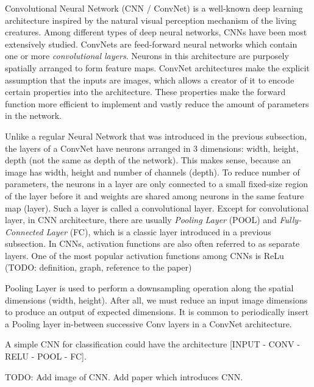 Convolutional Neural Network (CNN / ConvNet) is a well-known deep learning architecture inspired by the natural visual perception mechanism of the living creatures. Among different types of deep neural networks, CNNs have been most extensively studied. ConvNets are feed-forward neural networks which contain one or more \textit{convolutional layers}. Neurons in this architecture are purposely spatially arranged to form feature maps. ConvNet architectures make the explicit assumption that the inputs are images, which allows a creator of it to encode certain properties into the architecture. These properties make the forward function more efficient to implement and vastly reduce the amount of parameters in the network.

Unlike a regular Neural Network that was introduced in the previous subsection, the layers of a ConvNet have neurons arranged in 3 dimensions: width, height, depth (not the same as depth of the network). This makes sense, because an image has width, height and number of channels (depth). To reduce number of parameters, the neurons in a layer are only connected to a small fixed-size region of the layer before it and weights are shared among neurons in the same feature map (layer). Such a layer is called a convolutional layer. Except for convolutional layer, in CNN architecture, there are usually \textit{Pooling Layer} (POOL) and \textit{Fully-Connected Layer} (FC), which is a classic layer introduced in a previous subsection. In CNNs, activation functions are also often referred to as separate layers. One of the most popular activation functions among CNNs is ReLu (TODO: definition, graph, reference to the paper)

Pooling Layer is used to perform a downsampling operation along the spatial dimensions (width, height). After all, we must reduce an input image dimensions to produce an output of expected dimensions.  It is common to periodically insert a Pooling layer in-between successive Conv layers in a ConvNet architecture.

A simple CNN for classification could have the architecture [INPUT - CONV - RELU - POOL - FC].

TODO: Add image of CNN. Add paper which introduces CNN.

